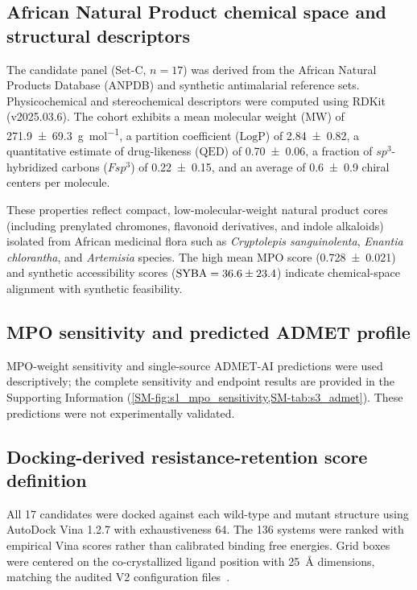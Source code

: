 \documentclass[journal=jcisd8,manuscript=article,layout=traditional]{achemso}
\begin{document}
\subsection{African Natural Product chemical space and structural descriptors}

The candidate panel (Set-C, $n=\num{17}$) was derived from the African Natural Products Database (ANPDB) and synthetic antimalarial reference sets. Physicochemical and stereochemical descriptors were computed using RDKit (v2025.03.6). The cohort exhibits a mean molecular weight ($\mathrm{MW}$) of \qty{271.9 \pm 69.3}{\g\per\mole}, a partition coefficient ($\mathrm{LogP}$) of \num{2.84 \pm 0.82}, a quantitative estimate of drug-likeness ($\mathrm{QED}$) of \num{0.70 \pm 0.06}, a fraction of $sp^3$-hybridized carbons ($Fsp^3$) of \num{0.22 \pm 0.15}, and an average of \num{0.6 \pm 0.9} chiral centers per molecule.

These properties reflect compact, low-molecular-weight natural product cores (including prenylated chromones, flavonoid derivatives, and indole alkaloids) isolated from African medicinal flora such as \textit{Cryptolepis sanguinolenta}, \textit{Enantia chlorantha}, and \textit{Artemisia} species. The high mean MPO score (\num{0.728 \pm 0.021}) and synthetic accessibility scores ($\mathrm{SYBA} = \num{36.6 \pm 23.4}$) indicate chemical-space alignment with synthetic feasibility.

\subsection{MPO sensitivity and predicted ADMET profile}

MPO-weight sensitivity and single-source ADMET-AI predictions were used descriptively; the complete sensitivity and endpoint results are provided in the Supporting Information (\cref{SM-fig:s1_mpo_sensitivity,SM-tab:s3_admet}). These predictions were not experimentally validated.

\subsection{Docking-derived resistance-retention score definition}\label{sec:rrs_formula}

All 17 candidates were docked against each wild-type and mutant structure using AutoDock Vina 1.2.7 with exhaustiveness \num{64}. The 136 systems were ranked with empirical Vina scores rather than calibrated binding free energies. Grid boxes were centered on the co-crystallized ligand position with \qty{25}{\angstrom} dimensions, matching the audited V2 configuration files~\citep{Temgoua2026}.
\end{document}
